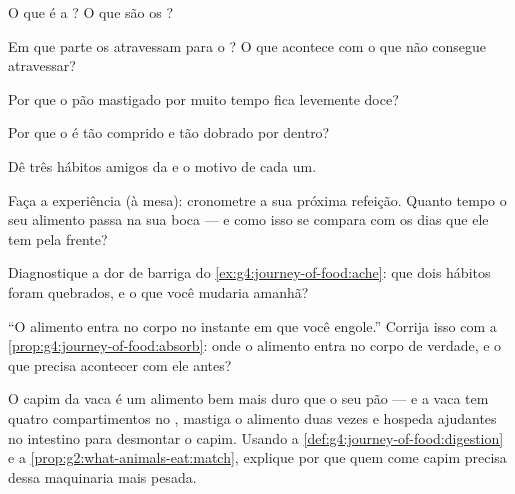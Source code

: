 \begin{exercise}[$\star$]\label{exo:g4:journey-of-food:3}
O que é a ? O que são os ?
\end{exercise}

\begin{exercise}[$\star$]\label{exo:g4:journey-of-food:4}
Em que parte os  atravessam para o ? O que acontece
com o que não consegue atravessar?
\end{exercise}

\begin{exercise}[$\star$]\label{exo:g4:journey-of-food:5}
Por que o pão mastigado por muito tempo fica levemente doce?
\end{exercise}

\begin{exercise}[$\star$]\label{exo:g4:journey-of-food:6}
Por que o  é tão comprido e tão dobrado por dentro?
\end{exercise}

\begin{exercise}[$\star$]\label{exo:g4:journey-of-food:7}
Dê três hábitos amigos da  e o motivo de cada um.
\end{exercise}

\begin{exercise}[$\star$]\label{exo:g4:journey-of-food:8}
Faça a experiência (à mesa): cronometre a sua próxima refeição.
Quanto tempo o seu alimento passa na sua boca --- e como isso se
compara com os dias que ele tem pela frente?
\end{exercise}

\begin{exercise}[$\star\star$]\label{exo:g4:journey-of-food:9}
Diagnostique a dor de barriga do \cref{ex:g4:journey-of-food:ache}:
que dois hábitos foram quebrados, e o que você mudaria amanhã?
\end{exercise}

\begin{exercise}[$\star\star$]\label{exo:g4:journey-of-food:10}
``O alimento entra no corpo no instante em que você engole.''
Corrija isso com a \cref{prop:g4:journey-of-food:absorb}: onde o
alimento entra no corpo de verdade, e o que precisa acontecer com
ele antes?
\end{exercise}

\begin{exercise}[$\star\star\star$]\label{exo:g4:journey-of-food:11}
O capim da vaca é um alimento bem mais duro que o seu pão --- e a
vaca tem quatro compartimentos no , mastiga o alimento duas
vezes e hospeda  ajudantes no intestino para desmontar o
capim. Usando a \cref{def:g4:journey-of-food:digestion} e a
\cref{prop:g2:what-animals-eat:match}, explique por que quem come
capim precisa dessa maquinaria mais pesada.
\end{exercise}

